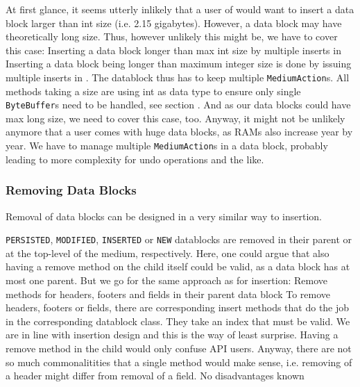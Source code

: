At first glance, it seems utterly inlikely that a user of \LibName{} would want to insert a data block larger than int size (i.e. 2.15 gigabytes). However, a data block may have theoretically long size. Thus, however unlikely this might be, we have to cover this case:
{%
Inserting a data block longer than max int size by multiple inserts in \COMPmedia{}
}
{%
Inserting a data block being longer than maximum integer size is done by issuing multiple inserts in \COMPmedia{}. The datablock thus has to keep multiple \texttt{MediumAction}s.
}
{%
All \COMPmedia{} methods taking a size are using int as data type to ensure only single \texttt{ByteBuffer}s need to be handled, see section . And as our data blocks could have max long size, we need to cover this case, too. Anyway, it might not be unlikely anymore that a user comes with huge data blocks, as RAMs also increase year by year.
}
{%
We have to manage multiple \texttt{MediumAction}s in a data block, probably leading to more complexity for undo operations and the like.
}



\subsubsection{Removing Data Blocks}%
\label{sec:RemovingDatablocks}%

Removal of data blocks can be designed in a very similar way to insertion.

\texttt{PERSISTED}, \texttt{MODIFIED}, \texttt{INSERTED} or \texttt{NEW} datablocks are removed in their parent or at the top-level of the medium, respectively. Here, one could argue that also having a remove method on the child itself could be valid, as a data block has at most one parent. But we go for the same approach as for insertion:
{%
Remove methods for headers, footers and fields in their parent data block
}
{%
To remove headers, footers or fields, there are corresponding insert methods that do the job in the corresponding datablock class. They take an index that must be valid.
}
{%
We are in line with insertion design and this is the way of least surprise. Having a remove method in the child would only confuse API users. Anyway, there are not so much commonalitities that a single method would make sense, i.e. removing of a header might differ from removal of a field.
}
{%
No disadvantages known
}

